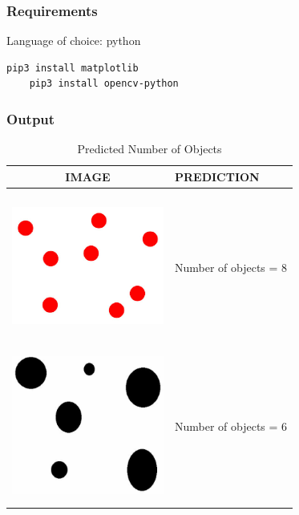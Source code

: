 \subsubsection{Requirements}
Language of choice: python
\begin{lstlisting}[language=bash]
	pip3 install matplotlib
	pip3 install opencv-python
\end{lstlisting}

\subsubsection{Output}

\begin{table}[!ht]
	\begin{center}
		\begin{tabular}{ | c | p{5cm} | }
			\hline
			IMAGE & PREDICTION \\ \hline
			\includegraphics[width=50mm, height=50mm]{question_2/Image-1.eps} & 
				Number of objects = 8 \\ \hline
			\includegraphics[width=50mm, height=50mm]{question_2/Image-2.eps} &
				Number of objects = 6 \\ \hline
		\end{tabular}
	\end{center}
\caption{Predicted Number of Objects}
\end{table}